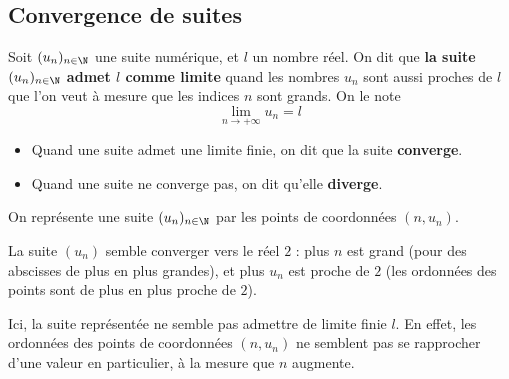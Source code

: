 \documentclass{article}
\begin{document}
\subsection{Convergence de suites}
\begin{tcolorbox}
\begin{definition}
Soit $(u_n)_{n \in \N}$ une suite numérique, et $l$ un nombre réel. On dit que \textbf{la suite $(u_n)_{n \in \N}$ admet $l$ comme limite} quand les nombres $u_n$ sont aussi proches de $l$ que l'on veut à mesure que les indices $n$ sont grands. On le note
\begin{equation*}
\lim_{n \to +\infty} u_n = l 
\end{equation*}
\end{definition}
\end{tcolorbox}
\begin{remark}
\hfill
\begin{itemize}
\item Quand une suite admet une limite finie, on dit que la suite \textbf{converge}.
\item Quand une suite ne converge pas, on dit qu'elle \textbf{diverge}.
\end{itemize}
\end{remark}
\begin{example}
On représente une suite $(u_n)_{n \in \N}$ par les points de coordonnées $(n,u_n)$. 

\begin{center}
\end{center}
\begin{tcolorbox}
La suite $(u_n)$ semble converger vers le réel $2$ : plus $n$ est grand (pour des abscisses de plus en plus grandes), et plus $u_n$ est proche de $2$ (les ordonnées des points sont de plus en plus proche de $2$).
\end{tcolorbox}
\begin{center}
\end{center}
\begin{tcolorbox}
Ici, la suite représentée ne semble pas admettre de limite finie $l$. En effet, les ordonnées des points de coordonnées $(n,u_n)$ ne semblent pas se rapprocher d'une valeur en particulier, à la mesure que $n$ augmente.
\end{tcolorbox}
\end{example}
\newpage
\end{document}
